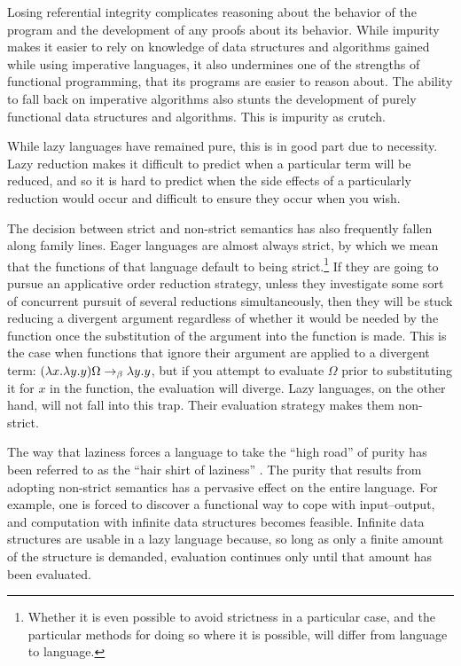 Losing referential integrity complicates reasoning about the behavior of the program and the development of any proofs about its behavior. While impurity makes it easier to rely on knowledge of data structures and algorithms gained while using imperative languages, it also undermines one of the strengths of functional programming, that its programs are easier to reason about. The ability to fall back on imperative algorithms also stunts the development of purely functional data structures and algorithms. This is impurity as crutch.

While lazy languages have remained pure, this is in good part due to necessity. Lazy reduction makes it difficult to predict when a particular term will be reduced, and so it is hard to predict when the side effects of a particularly reduction would occur and difficult to ensure they occur when you wish.

The decision between strict and non-strict semantics has also frequently fallen along family lines. Eager languages are almost always strict, by which we mean that the functions of that language default to being strict.\footnote{Whether it is even possible to avoid strictness in a particular case, and the particular methods for doing so where it is possible, will differ from language to language.} If they are going to pursue an applicative order reduction strategy, unless they investigate some sort of concurrent pursuit of several reductions simultaneously, then they will be stuck reducing a divergent argument regardless of whether it would be needed by the function once the substitution of the argument into the function is made. This is the case when functions that ignore their argument are applied to a divergent term: $(\lambda x. \lambda y. y) \Omega \betared \lambda y.y$, but if you attempt to evaluate $\Omega$ prior to substituting it for $x$ in the function, the evaluation will diverge. Lazy languages, on the other hand, will not fall into this trap. Their evaluation strategy makes them non-strict.

The way that laziness forces a language to take the ``high road'' of purity has been referred to as the ``hair shirt of laziness'' \citep{Peyton-Jones:Wearing:2003}. The purity that results from adopting non-strict semantics has a pervasive effect on the entire language. For example, one is forced to discover a functional way to cope with input--output, and computation with infinite data structures becomes feasible. Infinite data structures are usable in a lazy language because, so long as only a finite amount of the structure is demanded, evaluation continues only until that amount has been evaluated.

